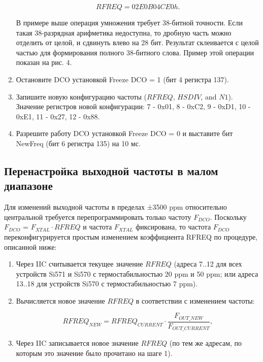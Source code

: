 \begin{enumerate}
	\begin{equation}	
		RFREQ = 02E0B04CE0h.
	\end{equation}

	В примере выше операция умножения требует 38-битной точности. Если такая 38-разрядная арифметика недоступна, то дробную часть можно отделить от целой, и сдвинуть влево на 28 бит. Результат склеивается с целой частью для формирования полного 38-битного слова. Пример этой операции показан на рис. 4.

	\item Остановите DCO установкой Freeze DCO = 1 (бит 4 регистра 137).

	\item Запишите новую конфигурацию частоты (\(RFREQ\), \(HSDIV\), and \(N1\)). Значение регистров новой конфигурации: 
	7 - 0x01, 8 - 0xC2, 9 - 0xD1, 10 - 0xE1, 11 - 0x27, 12 - 0x88.
	\item Разрешите работу DCO установкой Freeze DCO = 0 и выставите бит NewFreq (бит 6 регистра 135) на 10 мс.
\end{enumerate}

\subsection{Перенастройка выходной частоты в малом диапазоне}

Для изменений выходной частоты в пределах ±3500 ppm относительно центральной требуется перепрограммировать 
только частоту \(F_{DCO}\). Поскольку \(F_{DCO}\) = \(F_{XTAL} \cdot RFREQ\) и частота \(F_{XTAL}\) фиксирована, то частота \(F_{DCO}\) переконфигурируется простым изменением коэффициента RFREQ по процедуре, описанной ниже:

\begin{enumerate}
	\item Через IIC считывается текущее значение \(RFREQ\) (адреса 7..12 для всех устройств Si571 и Si570 с термостабильностью 20 ppm и 50 ppm; или адреса 13..18 для устройств Si570 с термостабильностью 7 ppm).

	\item Вычисляется новое значение \(RFREQ\) в соответствии с изменением частоты:
	
	\begin{equation}	
		RFREQ_{NEW} =  RFREQ_{CURRENT} \cdot \frac{F_{OUT\_NEW}}{F_{OUT\_CURRENT}},
	\end{equation}

	\item Через IIC записывается новое значение \(RFREQ\) (по тем же адресам, по которым это значение было прочитано на шаге 1).
\end{enumerate}

